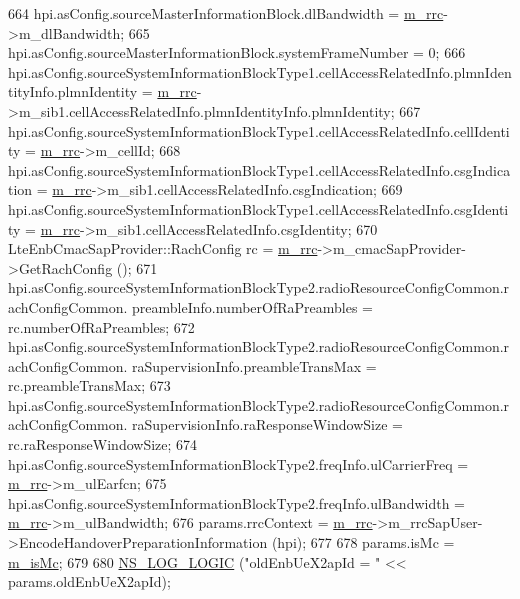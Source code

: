 \begin{DoxyCode}
664         hpi.asConfig.sourceMasterInformationBlock.dlBandwidth = \hyperlink{classns3_1_1UeManager_ab4405e9f354c66e7c1a4c95832290f5b}{m\_rrc}->m\_dlBandwidth;
665         hpi.asConfig.sourceMasterInformationBlock.systemFrameNumber = 0;
666         hpi.asConfig.sourceSystemInformationBlockType1.cellAccessRelatedInfo.plmnIdentityInfo.plmnIdentity 
      = \hyperlink{classns3_1_1UeManager_ab4405e9f354c66e7c1a4c95832290f5b}{m\_rrc}->m\_sib1.cellAccessRelatedInfo.plmnIdentityInfo.plmnIdentity;
667         hpi.asConfig.sourceSystemInformationBlockType1.cellAccessRelatedInfo.cellIdentity = 
      \hyperlink{classns3_1_1UeManager_ab4405e9f354c66e7c1a4c95832290f5b}{m\_rrc}->m\_cellId;
668         hpi.asConfig.sourceSystemInformationBlockType1.cellAccessRelatedInfo.csgIndication = 
      \hyperlink{classns3_1_1UeManager_ab4405e9f354c66e7c1a4c95832290f5b}{m\_rrc}->m\_sib1.cellAccessRelatedInfo.csgIndication;
669         hpi.asConfig.sourceSystemInformationBlockType1.cellAccessRelatedInfo.csgIdentity = 
      \hyperlink{classns3_1_1UeManager_ab4405e9f354c66e7c1a4c95832290f5b}{m\_rrc}->m\_sib1.cellAccessRelatedInfo.csgIdentity;
670         LteEnbCmacSapProvider::RachConfig rc = \hyperlink{classns3_1_1UeManager_ab4405e9f354c66e7c1a4c95832290f5b}{m\_rrc}->m\_cmacSapProvider->GetRachConfig ();
671         hpi.asConfig.sourceSystemInformationBlockType2.radioResourceConfigCommon.rachConfigCommon.
      preambleInfo.numberOfRaPreambles = rc.numberOfRaPreambles;
672         hpi.asConfig.sourceSystemInformationBlockType2.radioResourceConfigCommon.rachConfigCommon.
      raSupervisionInfo.preambleTransMax = rc.preambleTransMax;
673         hpi.asConfig.sourceSystemInformationBlockType2.radioResourceConfigCommon.rachConfigCommon.
      raSupervisionInfo.raResponseWindowSize = rc.raResponseWindowSize;
674         hpi.asConfig.sourceSystemInformationBlockType2.freqInfo.ulCarrierFreq = 
      \hyperlink{classns3_1_1UeManager_ab4405e9f354c66e7c1a4c95832290f5b}{m\_rrc}->m\_ulEarfcn;
675         hpi.asConfig.sourceSystemInformationBlockType2.freqInfo.ulBandwidth = 
      \hyperlink{classns3_1_1UeManager_ab4405e9f354c66e7c1a4c95832290f5b}{m\_rrc}->m\_ulBandwidth;
676         params.rrcContext = \hyperlink{classns3_1_1UeManager_ab4405e9f354c66e7c1a4c95832290f5b}{m\_rrc}->m\_rrcSapUser->EncodeHandoverPreparationInformation (hpi);
677 
678         params.isMc = \hyperlink{classns3_1_1UeManager_a78958b4916253f7e2f9da8fd7f4662b6}{m\_isMc};
679 
680         \hyperlink{group__logging_ga88acd260151caf2db9c0fc84997f45ce}{NS\_LOG\_LOGIC} (\textcolor{stringliteral}{"oldEnbUeX2apId = "} << params.oldEnbUeX2apId);

\end{DoxyCode}

